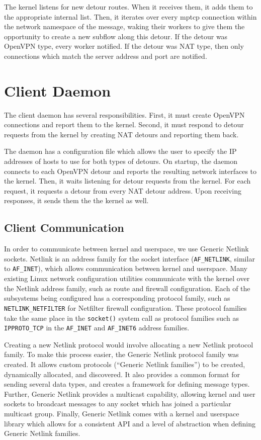 \documentclass{cwru}
\begin{document}
The kernel listens for new detour routes. When it receives them, it adds them to
the appropriate internal list. Then, it iterates over every \ac{mptcp} connection
within the network namespace of the message, waking their workers to give them
the opportunity to create a new subflow along this detour. If the detour was
OpenVPN type, every worker notified. If the detour was NAT type, then only
connections which match the server address and port are notified.

\section{Client Daemon}

The client daemon has several responsibilities. First, it must create OpenVPN
connections and report them to the kernel. Second, it must respond to detour
requests from the kernel by creating NAT detours and reporting them back.

The daemon has a configuration file which allows the user to specify the IP
addresses of hosts to use for both types of detours. On startup, the daemon
connects to each OpenVPN detour and reports the resulting network interfaces to
the kernel. Then, it waits listening for detour requests from the kernel. For
each request, it requests a detour from every NAT detour address. Upon receiving
responses, it sends them the the kernel as well.

\subsection{Client Communication}

In order to communicate between kernel and userspace, we use Generic Netlink
sockets. Netlink is an address family for the socket interface
(\texttt{AF\_NETLINK}, similar to \texttt{AF\_INET}), which allows communication
between kernel and userspace. Many existing Linux network configuration
utilities communicate with the kernel over the Netlink address family, such as
route and firewall configuration. Each of the subsystems being configured has a
corresponding protocol family, such as \texttt{NETLINK\_NETFILTER} for Netfilter
firewall configuration. These protocol families take the same place in the
\texttt{socket()} system call as protocol families such as \texttt{IPPROTO\_TCP}
in the \texttt{AF\_INET} and \texttt{AF\_INET6} address families.

Creating a new Netlink protocol would involve allocating a new Netlink protocol
family. To make this process easier, the Generic Netlink protocol family was
created. It allows custom protocols (``Generic Netlink families'') to be
created, dynamically allocated, and discovered. It also provides a common format
for sending several data types, and creates a framework for defining message
types. Further, Generic Netlink provides a multicast capability, allowing kernel
and user sockets to broadcast messages to any socket which has joined a
particular multicast group. Finally, Generic Netlink comes with a kernel and
userspace library which allows for a consistent API and a level of abstraction
when defining Generic Netlink families.
\end{document}

